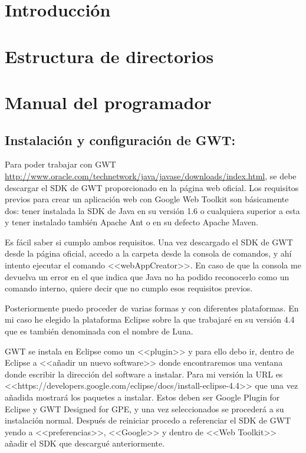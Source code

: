 
\section{Introducción}


\section{Estructura de directorios}

\section{Manual del programador}


\subsection{Instalación y configuración de GWT:}


Para poder trabajar con GWT \url{http://www.oracle.com/technetwork/java/javase/downloads/index.html}, se debe descargar el SDK de GWT proporcionado en la página web oficial. Los requisitos previos para crear un aplicación web con Google Web Toolkit son básicamente dos: tener instalada la SDK de Java en su versión 1.6 o cualquiera superior a esta y tener instalado también Apache Ant o en su defecto Apache Maven.

Es fácil saber si cumplo ambos requisitos. Una vez descargado el SDK de GWT desde la página oficial, accedo a la carpeta desde la consola de comandos, y ahí intento ejecutar el comando <<webAppCreator>>. En caso de que la consola me devuelva un error en el que indica que Java no ha podido reconocerlo como un comando interno, quiere decir que no cumplo esos requisitos previos.

Posteriormente puedo proceder de varias formas y con diferentes plataformas.
En mi caso he elegido la plataforma Eclipse sobre la que trabajaré en su
versión 4.4 que es también denominada  con el nombre de Luna.

GWT se instala en Eclipse como un <<plugin>> y para ello debo ir, dentro de Eclipse a <<añadir un nuevo software>> donde encontraremos una ventana donde escribir la dirección del software a instalar. Para mi versión la URL es <<https://developers.google.com/eclipse/docs/install-eclipse-4.4>> que una vez añadida mostrará los paquetes a instalar. Estos deben ser Google Plugin for Eclipse y GWT Designed for GPE, y una vez seleccionados se procederá a su instalación normal. Después de reiniciar procedo a referenciar el SDK de GWT yendo a <<preferencias>>, <<Google>> y dentro de <<Web Toolkit>> añadir el SDK que descargué anteriormente. 


